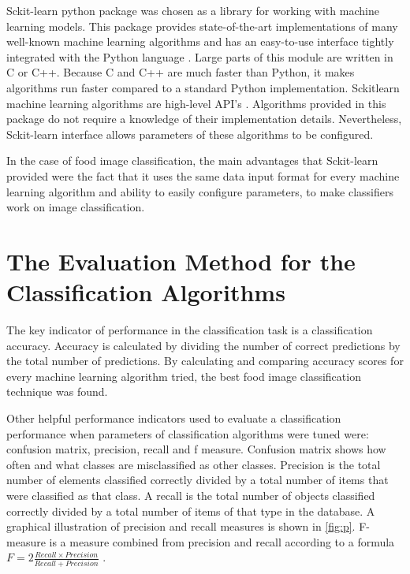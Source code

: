 Sckit-learn python package was chosen as a library for working with machine learning models. This package provides state-of-the-art implementations of many well-known machine learning algorithms and has an easy-to-use interface tightly integrated with the Python language \citep{pedregosa2011scikit}. Large parts of this module are written in C or C++. Because C and C++ are much faster than Python, it makes algorithms run faster compared to a standard Python implementation. Sckit\-learn machine learning algorithms are high-level API's \citep{buitinck2013api}. Algorithms provided in this package do not require a knowledge of their implementation details. Nevertheless, Sckit-learn interface allows parameters of these algorithms to be configured.

In the case of food image classification, the main advantages that Sckit-learn provided were the fact that it uses the same data input format for every machine learning algorithm and ability to easily configure parameters, to make classifiers work on image classification.


\section{The Evaluation Method for the Classification Algorithms}

The key indicator of performance in the classification task is a classification accuracy. Accuracy is calculated by dividing the number of correct predictions by the total number of predictions. By calculating and comparing accuracy scores for every machine learning algorithm tried, the best food image classification technique was found.

Other helpful performance indicators used to evaluate a classification performance when parameters of classification algorithms were tuned were: confusion matrix, precision, recall and f measure. Confusion matrix shows how often and what classes are misclassified as other classes. Precision is the total number of elements classified correctly divided by a total number of items that were classified as that class. A recall is the total number of objects classified correctly divided by a total number of items of that type in the database. A graphical illustration of precision and recall measures is shown in \autoref{fig:p}.  F-measure is a measure combined from precision and recall according to a formula \( F = 2 \frac{Recall \times Precision }{Recall  +  Precision} \)   \citep{ting2011}. 



